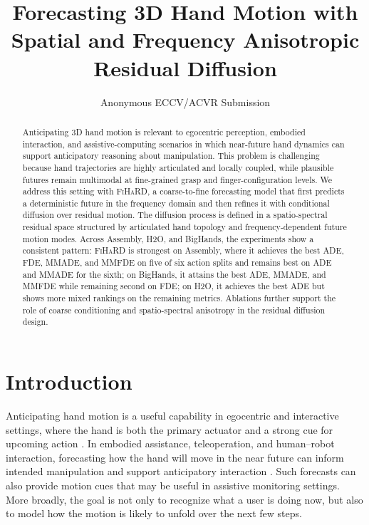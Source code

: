 \documentclass[runningheads]{llncs}
\title{Forecasting 3D Hand Motion with Spatial and Frequency Anisotropic Residual Diffusion}
\author{Anonymous ECCV/ACVR Submission}
\institute{Paper ID *****}
\newcommand{\modelname}{\textsc{FiHaRD}}
\begin{document}
\maketitle

\begin{abstract}
Anticipating 3D hand motion is relevant to egocentric perception, embodied interaction, and assistive-computing scenarios in which near-future hand dynamics can support anticipatory reasoning about manipulation. This problem is challenging because hand trajectories are highly articulated and locally coupled, while plausible futures remain multimodal at fine-grained grasp and finger-configuration levels. We address this setting with \modelname{}, a coarse-to-fine forecasting model that first predicts a deterministic future in the frequency domain and then refines it with conditional diffusion over residual motion. The diffusion process is defined in a spatio-spectral residual space structured by articulated hand topology and frequency-dependent future motion modes. Across Assembly, H2O, and BigHands, the experiments show a consistent pattern: \modelname{} is strongest on Assembly, where it achieves the best ADE, FDE, MMADE, and MMFDE on five of six action splits and remains best on ADE and MMADE for the sixth; on BigHands, it attains the best ADE, MMADE, and MMFDE while remaining second on FDE; on H2O, it achieves the best ADE but shows more mixed rankings on the remaining metrics. Ablations further support the role of coarse conditioning and spatio-spectral anisotropy in the residual diffusion design.

\end{abstract}

\section{Introduction}

Anticipating hand motion is a useful capability in egocentric and interactive settings, where the hand is both the primary actuator \cite{GarciaHernando2018FirstPerson} and a strong cue for upcoming action \cite{Liu2022Hotspots,Hatano2025EgoH4}. In embodied assistance, teleoperation, and human--robot interaction, forecasting how the hand will move in the near future can inform intended manipulation and support anticipatory interaction \cite{Kothari2023ConstrainedHRCMotionPrediction,Heman2026TeleoperationIntent}. Such forecasts can also provide motion cues that may be useful in assistive monitoring settings. More broadly, the goal is not only to recognize what a user is doing now, but also to model how the motion is likely to unfold over the next few steps.
\end{document}
